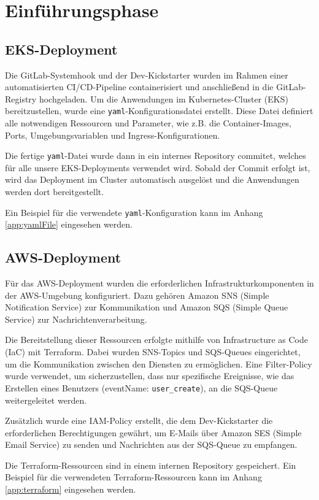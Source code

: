 \section{Einführungsphase}
\label{sec:Einfuehrungsphase}

\subsection{EKS-Deployment}
\label{sec:EKSDeployment}

Die GitLab-Systemhook und der Dev-Kickstarter wurden im Rahmen einer automatisierten CI/CD-Pipeline containerisiert und anschließend in die GitLab-Registry hochgeladen. Um die Anwendungen im Kubernetes-Cluster (EKS) bereitzustellen, wurde eine \texttt{yaml}-Konfigurationsdatei erstellt. Diese Datei definiert alle notwendigen Ressourcen und Parameter, wie z.B. die Container-Images, Ports, Umgebungsvariablen und Ingress-Konfigurationen.

Die fertige \texttt{yaml}-Datei wurde dann in ein internes Repository commitet, welches für alle unsere EKS-Deployments verwendet wird. Sobald der Commit erfolgt ist, wird das Deployment im Cluster automatisch ausgelöst und die Anwendungen werden dort bereitgestellt. 

Ein Beispiel für die verwendete \texttt{yaml}-Konfiguration kann im Anhang \ref{app:yamlFile} eingesehen werden.

\subsection{AWS-Deployment}
\label{sec:AWSDeployment}

Für das AWS-Deployment wurden die erforderlichen Infrastrukturkomponenten in der AWS-Umgebung konfiguriert. Dazu gehören Amazon SNS (Simple Notification Service) zur Kommunikation und Amazon SQS (Simple Queue Service) zur Nachrichtenverarbeitung. 

Die Bereitstellung dieser Ressourcen erfolgte mithilfe von Infrastructure as Code (IaC) mit Terraform. Dabei wurden SNS-Topics und SQS-Queues eingerichtet, um die Kommunikation zwischen den Diensten zu ermöglichen. Eine Filter-Policy wurde verwendet, um sicherzustellen, dass nur spezifische Ereignisse, wie das Erstellen eines Benutzers (eventName: \texttt{user\_create}), an die SQS-Queue weitergeleitet werden. 

Zusätzlich wurde eine IAM-Policy erstellt, die dem Dev-Kickstarter die erforderlichen Berechtigungen gewährt, um E-Mails über Amazon SES (Simple Email Service) zu senden und Nachrichten aus der SQS-Queue zu empfangen. 

Die Terraform-Ressourcen sind in einem internen Repository gespeichert. Ein Beispiel für die verwendeten Terraform-Ressourcen kann im Anhang \ref{app:terraform} eingesehen werden.
